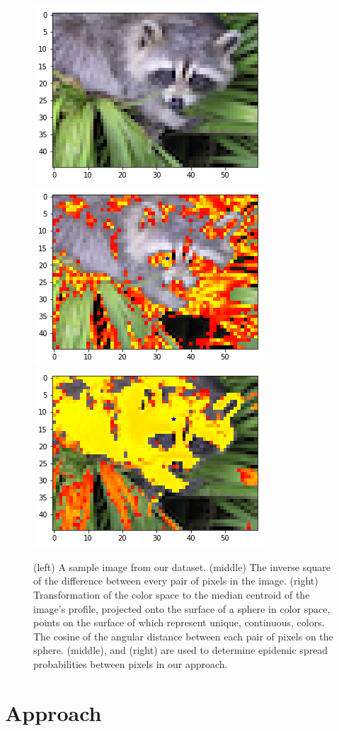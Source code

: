 \documentclass[twocolumn]{article}
\newcommand{\seclab}[1]{\label{sec:#1}}
\newcommand{\figlab}[1]{\label{fig:#1}}
\begin{document}
\begin{figure}[t]
\centering

\includegraphics[width=0.3\linewidth]{figs/input.png}
\includegraphics[width=0.3\linewidth]{figs/alpha.png}
\includegraphics[width=0.3\linewidth]{figs/beta.png}

\caption{
(left) A sample image from our dataset.
(middle) The inverse square of the difference between every pair of pixels in
the image. 
(right) Transformation of the color space to the median centroid of the image's
profile, projected onto the surface of a sphere in color space, points on the
surface of which represent unique, continuous, colors. The cosine of the angular
distance between each pair of pixels on the sphere.
(middle), and (right) are used to determine epidemic spread probabilities
between pixels in our approach.
}
\figlab{alpha_beta}
\end{figure}

\section{Approach}\seclab{approach}
\end{document}
